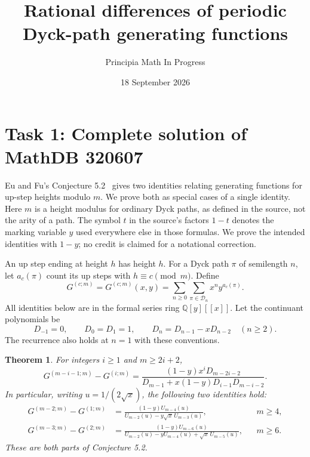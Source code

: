 \documentclass[11pt]{article}
\title{Rational differences of periodic Dyck-path generating functions}
\author{Principia Math In Progress}
\date{18 September 2026}
\newtheorem{theorem}{Theorem}
\newcommand{\G}[1]{G^{(#1;m)}}
\begin{document}
\maketitle

\section*{Task 1: Complete solution of MathDB 320607}
Eu and Fu's Conjecture 5.2~\cite{EF} gives two identities relating
generating functions for up-step heights modulo $m$. We prove both as
special cases of a single identity. Here $m$ is a height modulus for
ordinary Dyck paths, as defined in the source, not the arity of a path.
The symbol $t$ in the source's factors $1-t$ denotes the marking variable
$y$ used everywhere else in those formulas. We prove the intended
identities with $1-y$; no credit is claimed for a notational correction.

An up step ending at height $h$ has height $h$. For a Dyck path $\pi$ of
semilength $n$, let $a_c(\pi)$ count its up steps with $h\equiv c\pmod m$.
Define
\[
 \G c=\G c(x,y)=\sum_{n\geq0}\sum_{\pi\in\mathcal D_n}x^n y^{a_c(\pi)}.
\]
All identities below are in the formal series ring $\mathbb Q[y][[x]]$.
Let the continuant polynomials be
\[
 D_{-1}=0,\qquad D_0=D_1=1,\qquad
 D_n=D_{n-1}-xD_{n-2}\quad(n\geq2).
\]
The recurrence also holds at $n=1$ with these conventions.

\begin{theorem}\label{main}
For integers $i\geq1$ and $m\geq2i+2$,
\begin{equation}\label{general}
 \G{m-i-1}-\G i
 =\frac{(1-y)x^iD_{m-2i-2}}
 {D_{m-1}+x(1-y)D_{i-1}D_{m-i-2}}.
\end{equation}
In particular, writing $u=1/(2\sqrt x)$, the following two identities hold:
\begin{align}
 \G{m-2}-\G1
 &=\frac{(1-y)U_{m-4}(u)}
 {U_{m-2}(u)-y\sqrt x\,U_{m-3}(u)},&&m\geq4,\label{first}\\
 \G{m-3}-\G2
 &=\frac{(1-y)U_{m-6}(u)}
 {U_{m-2}(u)-yU_{m-4}(u)+\sqrt x\,U_{m-5}(u)},&&m\geq6.\label{second}
\end{align}
These are both parts of Conjecture 5.2.
\end{theorem}
\end{document}
